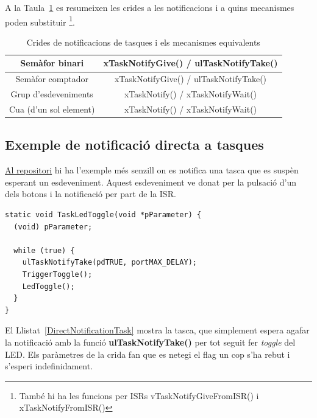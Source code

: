 A la Taula~\ref{tb:task_notifications} es resumeixen les crides a les notificacions i a quins mecanismes poden substituir \footnote{També hi ha les funcions per ISRs vTaskNotifyGiveFromISR() i xTaskNotifyFromISR()}.

\begin{table}
\caption{Crides de notificacions de tasques i els mecanismes equivalents }
\centering
\begin{tabular}{|c|c|}
\hline
 Semàfor binari & xTaskNotifyGive()  /  ulTaskNotifyTake() \\
\hline
 Semàfor comptador & xTaskNotifyGive() /  ulTaskNotifyTake() \\
\hline
Grup d'esdeveniments & xTaskNotify() /  xTaskNotifyWait()\\
\hline
Cua (d'un sol element) & xTaskNotify() /  xTaskNotifyWait()\\
\hline
\end{tabular}
\label{tb:task_notifications}
\end{table}

\subsection{Exemple de notificació directa a tasques}
\href{https://github.com/mariusmm/cursembedded/tree/master/Simplicity/FreeRTOS_TaskNotify}{Al repositori} hi ha l'exemple més senzill on es notifica una tasca que es suspèn esperant un esdeveniment. Aquest esdeveniment ve donat per la pulsació d'un dels botons i la notificació per part de la \gls{ISR}.

\begin{lstlisting}[style=customc,caption={Tasca que espera la notificació}, label=DirectNotificationTask]
static void TaskLedToggle(void *pParameter) {
  (void) pParameter;

  while (true) {
    ulTaskNotifyTake(pdTRUE, portMAX_DELAY);
    TriggerToggle();
    LedToggle();
  }
}
\end{lstlisting}

El Llistat~\ref{DirectNotificationTask} mostra la tasca, que simplement espera agafar la notificació amb la funció {\bf ulTaskNotifyTake()} per tot seguit fer {\em toggle} del LED. Els paràmetres de la crida fan que es netegi el flag un cop s'ha rebut i s'esperi indefinidament.

